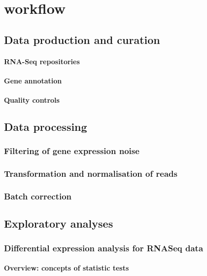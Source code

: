 \section{ workflow}

\subsection{Data production and curation}
\paragraph{RNA-Seq repositories}
\paragraph{Gene annotation}
\paragraph{Quality controls}

\subsection{Data processing}
\subsubsection{Filtering of gene expression noise}
\subsubsection{Transformation and normalisation of reads}
\subsubsection{Batch correction}

\subsection{Exploratory analyses}

\subsubsection{Differential expression analysis for RNASeq data}
\paragraph{Overview: concepts of statistic tests}

